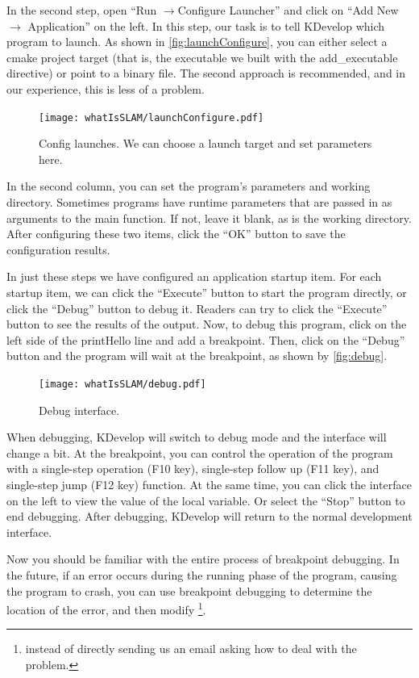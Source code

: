 In the second step, open ``Run $\rightarrow$Configure Launcher'' and click on ``Add New $\rightarrow$ Application'' on the left. In this step, our task is to tell KDevelop which program to launch. As shown in \autoref{fig:launchConfigure}, you can either select a cmake project target (that is, the executable we built with the add\_executable directive) or point to a binary file. The second approach is recommended, and in our experience, this is less of a problem.

\begin{figure}[!ht]
    \centering
    \texttt{[image: whatIsSLAM/launchConfigure.pdf]}
    \caption{Config launches. We can choose a launch target and set parameters here. }
    \label{fig:launchConfigure}
\end{figure}

In the second column, you can set the program's parameters and working directory. Sometimes programs have runtime parameters that are passed in as arguments to the main function. If not, leave it blank, as is the working directory. After configuring these two items, click the ``OK'' button to save the configuration results.

In just these steps we have configured an application startup item. For each startup item, we can click the ``Execute'' button to start the program directly, or click the ``Debug'' button to debug it. Readers can try to click the ``Execute'' button to see the results of the output. Now, to debug this program, click on the left side of the printHello line and add a breakpoint. Then, click on the ``Debug'' button and the program will wait at the breakpoint, as shown by \autoref{fig:debug}.

\begin{figure}[!htp]
    \centering
    \texttt{[image: whatIsSLAM/debug.pdf]}
    \caption{Debug interface. }
    \label{fig:debug}
\end{figure}

When debugging, KDevelop will switch to debug mode and the interface will change a bit. At the breakpoint, you can control the operation of the program with a single-step operation (F10 key), single-step follow up (F11 key), and single-step jump (F12 key) function. At the same time, you can click the interface on the left to view the value of the local variable. Or select the ``Stop'' button to end debugging. After debugging, KDevelop will return to the normal development interface.

Now you should be familiar with the entire process of breakpoint debugging. In the future, if an error occurs during the running phase of the program, causing the program to crash, you can use breakpoint debugging to determine the location of the error, and then modify \footnote{ instead of directly sending us an email asking how to deal with the problem. }.

